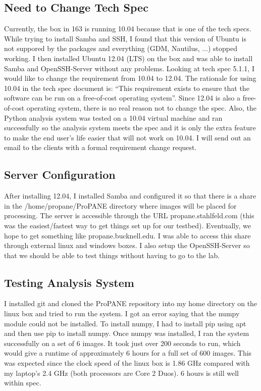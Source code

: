 \documentclass[]{article}
\begin{document}
        	\subsection{Need to Change Tech Spec}
			Currently, the box in 163 is running 10.04 because that is one of the tech specs. While trying to install Samba and SSH, I found that this version of Ubuntu is not suppored by the packages and everything (GDM, Nautilus, ...) stopped working. I then installed Ubuntu 12.04 (LTS) on the box and was able to install Samba and OpenSSH-Server without any problems. Looking at tech spec 5.1.1, I would like to change the requirement from 10.04 to 12.04. The rationale for using 10.04 in the tech spec document is: ``This requirement exists to ensure that the software can be run on a free-of-cost operating system''. Since 12.04 is also a free-of-cost operating system, there is no real reason not to change the spec. Also, the Python analysis system was tested on a 10.04 virtual machine and ran successfully so the analysis system meets the spec and it is only the extra feature to make the end user's life easier that will not work on 10.04. I will send out an email to the clients with a formal requirement change request. 

       	 \subsection{Server Configuration}
			After installing 12.04, I installed Samba and configured it so that there is a share in the /home/propane/ProPANE directory where images will be placed for processing. The server is accessible through the URL propane.stahlfeld.com (this was the easiest/fastest way to get things set up for our testbed). Eventually, we hope to get something like propane.bucknell.edu. I was able to access this share through external linux and windows boxes. I also setup the OpenSSH-Server so that we should be able to test things without having to go to the lab.

       	 \subsection{Testing Analysis System}
			I installed git and cloned the ProPANE repository into my home directory on the linux box and tried to run the system. I got an error saying that the numpy module could not be installed. To install numpy, I had to install pip using apt and then use pip to install numpy. Once numpy was installed, I ran the system successfully on a set of 6 images. It took just over 200 seconds to run, which would give a runtime of approximately 6 hours for a full set of 600 images. This was expected since the clock speed of the linux box is 1.86 GHz compared with my laptop's 2.4 GHz (both processors are Core 2 Duos). 6 hours is still well within spec.
\end{document}
